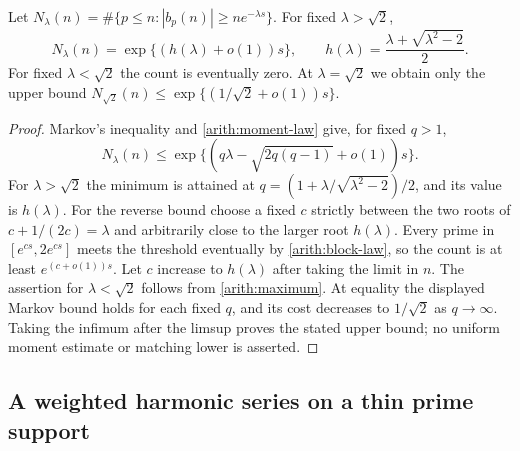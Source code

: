 \begin{corollary}\label{arith:exceptional}
Let $N_\lambda(n)=\#\{p\le n:|b_p(n)|\ge ne^{-\lambda s}\}$.
For fixed $\lambda>\sqrt2$,
\[
 N_\lambda(n)=\exp\{(h(\lambda)+o(1))s\},\qquad
 h(\lambda)=\frac{\lambda+\sqrt{\lambda^2-2}}2.
\]
For fixed $\lambda<\sqrt2$ the count is eventually zero.
At $\lambda=\sqrt2$ we obtain only the upper bound
$N_{\sqrt2}(n)\le\exp\{(1/\sqrt2+o(1))s\}$.
\end{corollary}
\begin{proof}
Markov's inequality and \eqref{arith:moment-law} give, for fixed $q>1$,
\[
 N_\lambda(n)\le
 \exp\{(q\lambda-\sqrt{2q(q-1)}+o(1))s\}.
\]
For $\lambda>\sqrt2$ the minimum is attained at
$q=(1+\lambda/\sqrt{\lambda^2-2})/2$, and its value is $h(\lambda)$.
For the reverse bound choose a fixed $c$ strictly between the two roots
of $c+1/(2c)=\lambda$ and arbitrarily close to the larger root
$h(\lambda)$. Every prime in $[e^{cs},2e^{cs}]$ meets the threshold
eventually by \eqref{arith:block-law}, so the count is at least
$e^{(c+o(1))s}$. Let $c$ increase to $h(\lambda)$ after taking the
limit in $n$. The assertion for $\lambda<\sqrt2$ follows from
\eqref{arith:maximum}. At equality the displayed Markov bound holds
for each fixed $q$, and its cost decreases to $1/\sqrt2$ as
$q\to\infty$. Taking the infimum after the limsup proves the stated
upper bound; no uniform moment estimate or matching lower is asserted.
\end{proof}

\subsection{A weighted harmonic series on a thin prime support}

